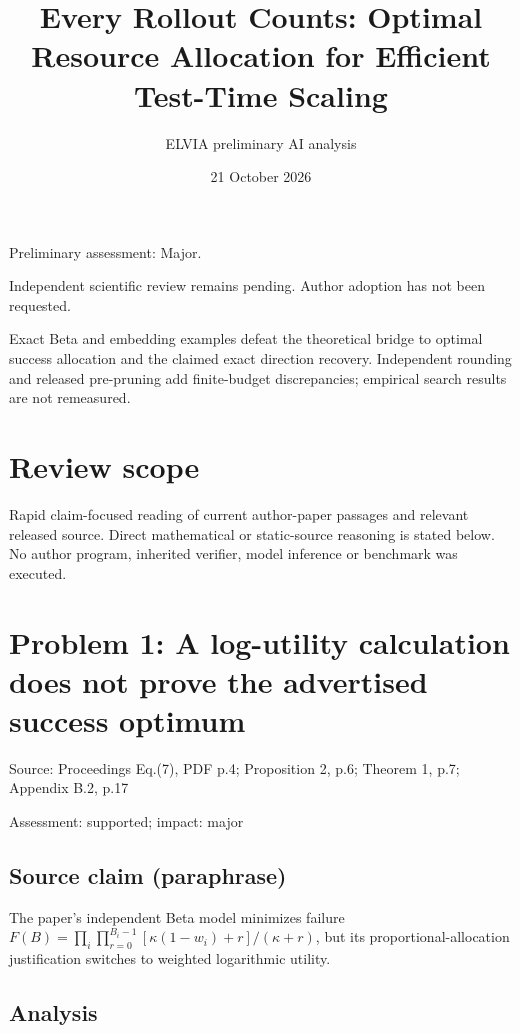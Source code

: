 \documentclass[11pt]{article}
\begin{document}
\title{Every Rollout Counts: Optimal Resource Allocation for Efficient Test-Time Scaling}

\author{ELVIA preliminary AI analysis}\date{21 October 2026}\maketitle

Preliminary assessment: Major.\par

Independent scientific review remains pending. Author adoption has not been requested.

Exact Beta and embedding examples defeat the theoretical bridge to optimal success allocation and the claimed exact direction recovery. Independent rounding and released pre-pruning add finite-budget discrepancies; empirical search results are not remeasured.

\section*{Review scope}

Rapid claim-focused reading of current author-paper passages and relevant released source. Direct mathematical or static-source reasoning is stated below. No author program, inherited verifier, model inference or benchmark was executed.

\section*{Problem 1: A log-utility calculation does not prove the advertised success optimum}

Source: Proceedings Eq.(7), PDF p.4; Proposition 2, p.6; Theorem 1, p.7; Appendix B.2, p.17

Assessment: supported; impact: major

\subsection*{Source claim (paraphrase)}

The paper’s independent Beta model minimizes failure \(F(B)=\prod_i\prod_{r=0}^{B_i-1}[\kappa(1-w_i)+r]/(\kappa+r)\), but its proportional-allocation justification switches to weighted logarithmic utility.

\subsection*{Analysis}
\end{document}

